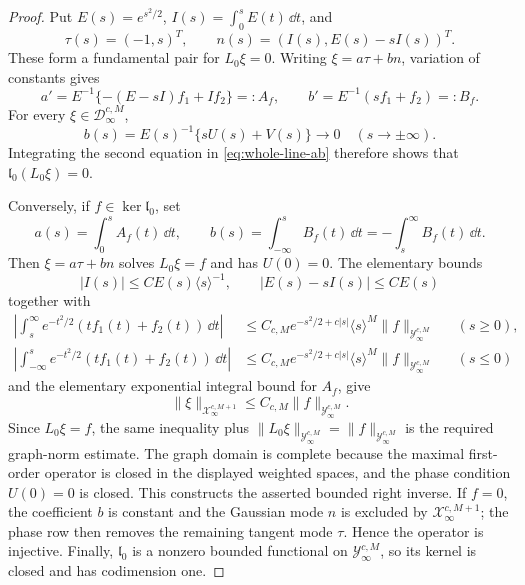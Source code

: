 \begin{proof}
Put \(E(s)=e^{s^2/2}\), \(I(s)=\int_0^sE(t)\,\dd t\), and
\[
 \tau(s)=(-1,s)^T,\qquad
 n(s)=(I(s),E(s)-sI(s))^T.
\]
These form a fundamental pair for \(L_0\xi=0\).  Writing
\(\xi=a\tau+bn\), variation of constants gives
\begin{equation}
 a'=E^{-1}\{-(E-sI)f_1+If_2\}=:A_f,\qquad
 b'=E^{-1}(sf_1+f_2)=:B_f.                            \label{eq:whole-line-ab}
\end{equation}
For every \(\xi\in\mathcal D_\infty^{c,M}\),
\[
 b(s)=E(s)^{-1}\{sU(s)+V(s)\}\longrightarrow0
 \quad(s\to\pm\infty).
\]
Integrating the second equation in \cref{eq:whole-line-ab} therefore shows
that \(\mathfrak l_0(L_0\xi)=0\).

Conversely, if \(f\in\ker\mathfrak l_0\), set
\begin{equation}
 a(s)=\int_0^sA_f(t)\,\dd t,\qquad
 b(s)=\int_{-\infty}^sB_f(t)\,\dd t
     =-\int_s^\infty B_f(t)\,\dd t.                  \label{eq:whole-line-green}
\end{equation}
Then \(\xi=a\tau+bn\) solves \(L_0\xi=f\) and has \(U(0)=0\).
The elementary bounds
\[
 |I(s)|\le CE(s)\langle s\rangle^{-1},\qquad
 |E(s)-sI(s)|\le CE(s)
\]
together with
\begin{align*}
 \left|\int_s^\infty e^{-t^2/2}(tf_1(t)+f_2(t))\,\dd t\right|
 &\le C_{c,M}e^{-s^2/2+c|s|}\langle s\rangle^M\|f\|_{\mathcal Y_\infty^{c,M}}
 &&(s\ge0),\\
 \left|\int_{-\infty}^s e^{-t^2/2}(tf_1(t)+f_2(t))\,\dd t\right|
 &\le C_{c,M}e^{-s^2/2+c|s|}\langle s\rangle^M\|f\|_{\mathcal Y_\infty^{c,M}}
 &&(s\le0)
\end{align*}
and the elementary exponential integral bound for \(A_f\), give
\[
 \|\xi\|_{\mathcal X_\infty^{c,M+1}}
 \le C_{c,M}\|f\|_{\mathcal Y_\infty^{c,M}}.
\]
Since \(L_0\xi=f\), the same inequality plus
\(\|L_0\xi\|_{\mathcal Y_\infty^{c,M}}=\|f\|_{\mathcal Y_\infty^{c,M}}\)
is the required graph-norm estimate.  The graph domain is complete because
the maximal first-order operator is closed in the displayed weighted
spaces, and the phase condition \(U(0)=0\) is closed.  This constructs the
asserted bounded right inverse.  If \(f=0\), the
coefficient \(b\) is constant and the Gaussian mode \(n\) is excluded by
\(\mathcal X_\infty^{c,M+1}\); the phase row then removes the remaining
tangent mode \(\tau\).  Hence the operator is injective.  Finally,
\(\mathfrak l_0\) is a nonzero bounded functional on
\(\mathcal Y_\infty^{c,M}\), so its kernel is closed and has codimension one.
\end{proof}

